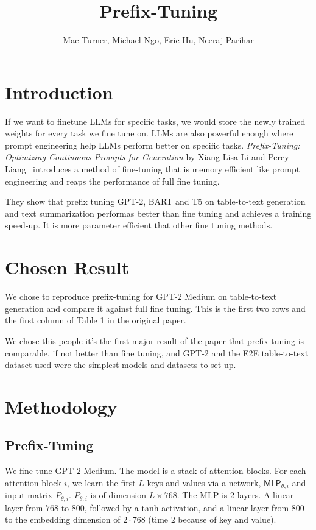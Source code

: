 \documentclass[11pt]{article} %
\title{Prefix-Tuning}
\author{Mac Turner, Michael Ngo, Eric Hu, Neeraj Parihar}
\begin{document}
\maketitle

\section{Introduction}
If we want to finetune LLMs for specific tasks, we would store the newly trained weights for every task we fine tune on. LLMs are also powerful enough where prompt engineering help LLMs perform better on specific tasks. \textit{Prefix-Tuning: Optimizing Continuous Prompts for Generation} by Xiang Lisa Li and Percy Liang~\cite{li-liang-2021-prefix} introduces a method of fine-tuning that is memory efficient like prompt engineering and reaps the performance of full fine tuning.

They show that prefix tuning GPT-2, BART and T5 on table-to-text generation and text summarization performas better than fine tuning and achieves a training speed-up. It is more parameter efficient that other fine tuning methods.

\section{Chosen Result}

We chose to reproduce prefix-tuning for GPT-2 Medium on table-to-text generation and compare it against full fine tuning. This is the first two rows and the first column of Table 1 in the original paper.

We chose this people it's the first major result of the paper that prefix-tuning is comparable, if not better than fine tuning, and GPT-2 and the E2E table-to-text dataset used were the simplest models and datasets to set up.

\section{Methodology}

\subsection{Prefix-Tuning}
We fine-tune GPT-2 Medium. The model is a stack of attention blocks. For each attention block $i$, we learn the first $L$ keys and values via a network, $\textsf{MLP}_{\theta,i}$ and input matrix $P_{\theta,i}$. $P_{\theta,i}$ is of dimension $L\times 768$. The MLP is 2 layers. A linear layer from $768$ to $800$, followed by a tanh activation, and a linear layer from $800$ to the embedding dimension of $2\cdot 768$ (time $2$ because of key and value).
\end{document}
